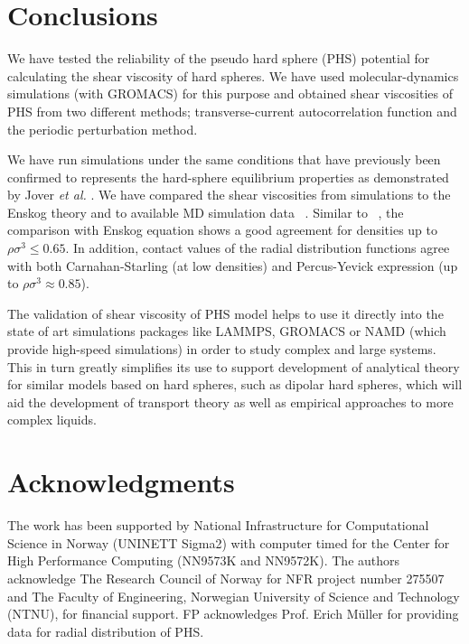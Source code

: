 \documentclass[preprint,pre,aps,superscriptaddress,a4paper]{revtex4}
\begin{document}
\section{Conclusions}
We have tested the reliability of the  pseudo hard sphere (PHS) potential for calculating the shear viscosity of hard spheres. We have used molecular-dynamics simulations (with GROMACS) for this purpose and obtained shear viscosities of PHS from two different methods; transverse-current autocorrelation function and the periodic perturbation method.    

We have run simulations under the same conditions that have previously been confirmed to
 represents the hard-sphere equilibrium properties as demonstrated by  Jover {\it {et al.}} \cite{jover:12:0}.
We have compared the shear viscosities from simulations to the Enskog theory and to available MD simulation data  ~\cite{heyes:09:0}.  Similar to  ~\cite{heyes:09:0}, the comparison with Enskog equation shows a good agreement for densities up to $\rho\sigma^3\le 0.65$.
In addition, contact values of the radial distribution functions agree with both Carnahan-Starling (at low densities)  and Percus-Yevick expression (up to $\rho\sigma^3\approx0.85$).

The validation of shear viscosity of PHS model helps to use it directly into the state of art simulations packages like LAMMPS, GROMACS or  NAMD  (which provide high-speed simulations) in order to study  complex and large systems.
This in turn greatly simplifies its use to support development of analytical theory for similar models based on hard spheres, such as dipolar hard spheres, which will aid the development of transport theory  as well as empirical approaches to more complex liquids.
\section{Acknowledgments}
The work has been supported by National Infrastructure for Computational Science in Norway
(UNINETT Sigma2) with computer timed for the Center for High Performance Computing (NN9573K and NN9572K). The authors acknowledge The Research Council of Norway for NFR project number 275507  and The Faculty of Engineering, Norwegian University of Science and Technology (NTNU), for financial support. FP acknowledges  Prof. Erich  M{\"u}ller for providing data for radial distribution of PHS. 
 

\end{document}
